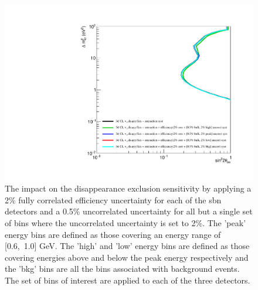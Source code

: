 \begin{figure}[h!]
    \centering
    \includegraphics[width = \largefigwidth]{figures-chap6/exclusion_contours/efficiency_systematics/nue_disapp_2pct_cor_05pct_bulk_2pct_X_uncor.pdf}
    \caption[\nue disapp with poorly constrained efficiency systematic for a set of bins.]{The impact on the \nue disappearance exclusion sensitivity by applying a 2\% fully correlated efficiency uncertainty for each of the \gls{sbn} detectors and a 0.5\% uncorrelated uncertainty for all but a single set of bins where the uncorrelated uncertainty is set to 2\%. The 'peak' energy bins are defined as those covering an energy range of [0.6,~1.0] GeV. The 'high' and 'low' energy bins are defined as those covering energies above and below the peak energy respectively and the 'bkg' bins are all the bins associated with background events. The set of bins of interest are applied to each of the three detectors.}
    \label{fig:nue_disapp_bulk_uncertainty}
\end{figure}




